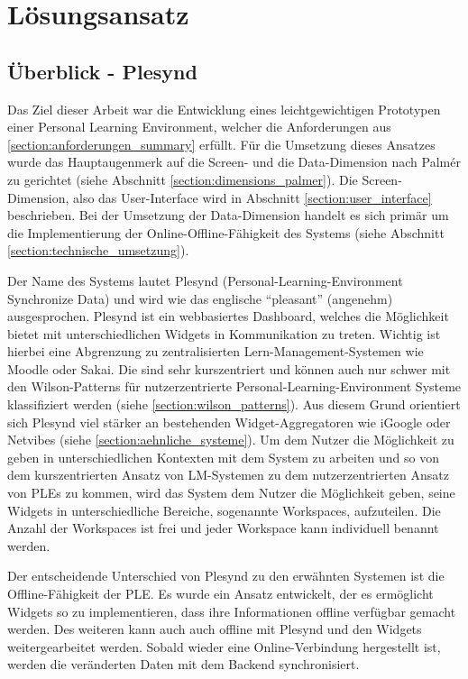 \chapter{Lösungsansatz} 
\label{chapter:Kapitel5}

\section{Überblick - Plesynd}
Das Ziel dieser Arbeit war die Entwicklung eines leichtgewichtigen Prototypen einer Personal Learning Environment, welcher die Anforderungen aus \ref{section:anforderungen_summary} erfüllt. Für die Umsetzung dieses Ansatzes wurde das Hauptaugenmerk auf die Screen- und die Data-Dimension nach Palmér zu gerichtet (siehe Abschnitt \ref{section:dimensions_palmer}). Die Screen-Dimension, also das User-Interface wird in Abschnitt \ref{section:user_interface} beschrieben. Bei der Umsetzung der Data-Dimension handelt es sich primär um die Implementierung der Online-Offline-Fähigkeit des Systems (siehe Abschnitt \ref{section:technische_umsetzung}).

Der Name des Systems lautet Plesynd (Personal-Learning-Environment Synchronize Data) und wird wie das englische "`pleasant"' (angenehm) ausgesprochen. Plesynd ist ein webbasiertes Dashboard, welches die Möglichkeit bietet mit unterschiedlichen Widgets in Kommunikation zu treten. Wichtig ist hierbei eine Abgrenzung zu zentralisierten Lern-Management-Systemen wie Moodle oder Sakai. Die sind sehr kurszentriert und können auch nur schwer mit den Wilson-Patterns für nutzerzentrierte Personal-Learning-Environment Systeme klassifiziert werden (siehe \ref{section:wilson_patterns}). Aus diesem Grund orientiert sich Plesynd viel stärker an bestehenden Widget-Aggregatoren wie iGoogle oder Netvibes (siehe \ref{section:aehnliche_systeme}). Um dem Nutzer die Möglichkeit zu geben in unterschiedlichen Kontexten mit dem System zu arbeiten und so von dem kurszentrierten Ansatz von LM-Systemen zu dem nutzerzentrierten Ansatz von PLEs zu kommen, wird das System dem Nutzer die Möglichkeit geben, seine Widgets in unterschiedliche Bereiche, sogenannte Workspaces, aufzuteilen. Die Anzahl der Workspaces ist frei und jeder Workspace kann individuell benannt werden.

Der entscheidende Unterschied von Plesynd zu den erwähnten Systemen ist die Offline-Fähigkeit der PLE. Es wurde ein Ansatz entwickelt, der es ermöglicht Widgets so zu implementieren, dass ihre Informationen offline verfügbar gemacht werden. Des weiteren kann auch auch offline mit Plesynd und den Widgets weitergearbeitet werden. Sobald wieder eine Online-Verbindung hergestellt ist, werden die veränderten Daten mit dem Backend synchronisiert.

